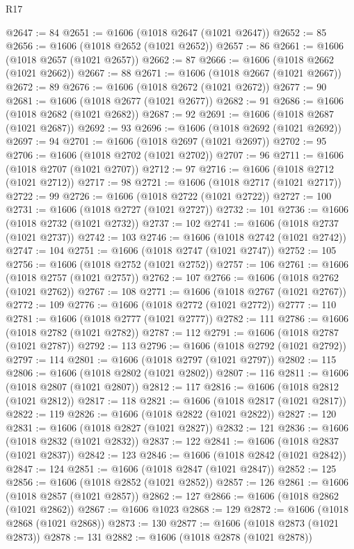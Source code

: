 \begin{lexlean}{R17}
\begin{coremodule}
{{{{{{{{{{{{{{{{{{{{{{{{{{{{{{{{{{{{{{{{{{{{{{{{{{{{{{{{{{{{{{{{{{{{{{{{{{{{{{{{{{{{{{{{{{{{{{{{{{{{{{{{{{{@2647 := 84
@2651 := @1606 (@1018 @2647 (@1021 @2647))
@2652 := 85
@2656 := @1606 (@1018 @2652 (@1021 @2652))
@2657 := 86
@2661 := @1606 (@1018 @2657 (@1021 @2657))
@2662 := 87
@2666 := @1606 (@1018 @2662 (@1021 @2662))
@2667 := 88
@2671 := @1606 (@1018 @2667 (@1021 @2667))
@2672 := 89
@2676 := @1606 (@1018 @2672 (@1021 @2672))
@2677 := 90
@2681 := @1606 (@1018 @2677 (@1021 @2677))
@2682 := 91
@2686 := @1606 (@1018 @2682 (@1021 @2682))
@2687 := 92
@2691 := @1606 (@1018 @2687 (@1021 @2687))
@2692 := 93
@2696 := @1606 (@1018 @2692 (@1021 @2692))
@2697 := 94
@2701 := @1606 (@1018 @2697 (@1021 @2697))
@2702 := 95
@2706 := @1606 (@1018 @2702 (@1021 @2702))
@2707 := 96
@2711 := @1606 (@1018 @2707 (@1021 @2707))
@2712 := 97
@2716 := @1606 (@1018 @2712 (@1021 @2712))
@2717 := 98
@2721 := @1606 (@1018 @2717 (@1021 @2717))
@2722 := 99
@2726 := @1606 (@1018 @2722 (@1021 @2722))
@2727 := 100
@2731 := @1606 (@1018 @2727 (@1021 @2727))
@2732 := 101
@2736 := @1606 (@1018 @2732 (@1021 @2732))
@2737 := 102
@2741 := @1606 (@1018 @2737 (@1021 @2737))
@2742 := 103
@2746 := @1606 (@1018 @2742 (@1021 @2742))
@2747 := 104
@2751 := @1606 (@1018 @2747 (@1021 @2747))
@2752 := 105
@2756 := @1606 (@1018 @2752 (@1021 @2752))
@2757 := 106
@2761 := @1606 (@1018 @2757 (@1021 @2757))
@2762 := 107
@2766 := @1606 (@1018 @2762 (@1021 @2762))
@2767 := 108
@2771 := @1606 (@1018 @2767 (@1021 @2767))
@2772 := 109
@2776 := @1606 (@1018 @2772 (@1021 @2772))
@2777 := 110
@2781 := @1606 (@1018 @2777 (@1021 @2777))
@2782 := 111
@2786 := @1606 (@1018 @2782 (@1021 @2782))
@2787 := 112
@2791 := @1606 (@1018 @2787 (@1021 @2787))
@2792 := 113
@2796 := @1606 (@1018 @2792 (@1021 @2792))
@2797 := 114
@2801 := @1606 (@1018 @2797 (@1021 @2797))
@2802 := 115
@2806 := @1606 (@1018 @2802 (@1021 @2802))
@2807 := 116
@2811 := @1606 (@1018 @2807 (@1021 @2807))
@2812 := 117
@2816 := @1606 (@1018 @2812 (@1021 @2812))
@2817 := 118
@2821 := @1606 (@1018 @2817 (@1021 @2817))
@2822 := 119
@2826 := @1606 (@1018 @2822 (@1021 @2822))
@2827 := 120
@2831 := @1606 (@1018 @2827 (@1021 @2827))
@2832 := 121
@2836 := @1606 (@1018 @2832 (@1021 @2832))
@2837 := 122
@2841 := @1606 (@1018 @2837 (@1021 @2837))
@2842 := 123
@2846 := @1606 (@1018 @2842 (@1021 @2842))
@2847 := 124
@2851 := @1606 (@1018 @2847 (@1021 @2847))
@2852 := 125
@2856 := @1606 (@1018 @2852 (@1021 @2852))
@2857 := 126
@2861 := @1606 (@1018 @2857 (@1021 @2857))
@2862 := 127
@2866 := @1606 (@1018 @2862 (@1021 @2862))
@2867 := @1606 @1023
@2868 := 129
@2872 := @1606 (@1018 @2868 (@1021 @2868))
@2873 := 130
@2877 := @1606 (@1018 @2873 (@1021 @2873))
@2878 := 131
@2882 := @1606 (@1018 @2878 (@1021 @2878))
}}}}}}}}}}}}}}}}}}}}}}}}}}}}}}}}}}}}}}}}}}}}}}}}}}}}}}}}}}}}}}}}}}}}}}}}}}}}}}}}}}}}}}}}}}}}}}}}}}}}}}}}}}}
\end{coremodule}
\end{lexlean}
